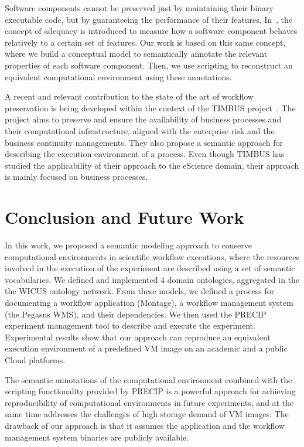 \documentclass[final,5p,times,twocolumn]{elsarticle}
\begin{document}
Software components cannot be preserved just by maintaining their binary executable code, but by guaranteeing the performance of their features. In~\cite{Matthews}, the concept of adequacy is introduced to measure how a software component behaves relatively to a certain set of features. Our work is based on this same concept, where we build a conceptual model to semantically annotate the relevant properties of each software component. Then, we use scripting to reconstruct an equivalent computational environment using these annotations.

A recent and relevant contribution to the state of the art of workflow preservation is being developed within the context of the TIMBUS project~\cite{timbus}. The project  aims to preserve and ensure the availability of business processes and their computational infrastructure, aligned with the enterprise risk and the business continuity managements. They also propose a semantic approach for describing the execution environment of a process.  Even though TIMBUS has studied the applicability of their approach to the eScience domain, their approach is mainly focused on business processes.


\section{Conclusion and Future Work}
\label{sec:conclusion}

In this work, we proposed a semantic modeling approach to conserve computational environments in scientific workflow executions, where  the resources involved in the execution of the experiment are described using a set of semantic vocabularies. We defined and implemented 4 domain ontologies, aggregated in the the WICUS ontology network. From these models, we defined a process for documenting a workflow application (Montage), a workflow management system (the Pegasus WMS), and their dependencies. We then used the PRECIP experiment management tool to describe and execute the experiment. Experimental results show that our approach can reproduce an equivalent execution environment of a predefined VM image on an academic and a public Cloud platforms.

The semantic annotations of the computational environment combined with the scripting functionality provided by PRECIP is a powerful approach for achieving reproducibility of computational environments in future experiments, and at the same time addresses the challenges of high storage demand of VM images. The drawback of our approach is that it assumes the application and the workflow management system binaries are publicly available.
\end{document}
